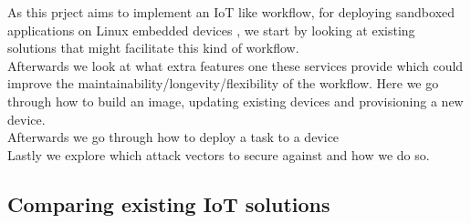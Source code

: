 \documentclass[../../main.tex]{subfiles}
\begin{document}
As this prject aims to implement an IoT like workflow, for deploying sandboxed applications
on Linux embedded devices , we start by looking at existing solutions that might
facilitate this kind of workflow.\\

Afterwards we look at what extra features one these services provide which could improve
the maintainability/longevity/flexibility of the workflow.
Here we go through how to build an image, updating existing devices and provisioning a new
device.\\

Afterwards we go through how to deploy a task to a device\\

Lastly we explore which attack vectors to secure against and how we do so.

\subsection{Comparing existing IoT solutions}%
\label{sub:comparing_existing_iot_solutions}

	
\end{document}
